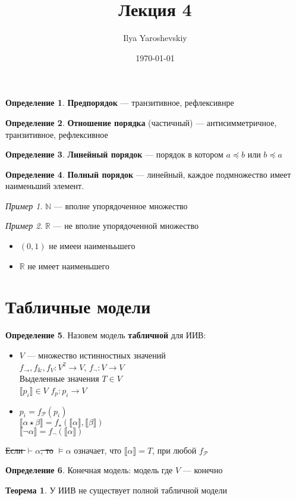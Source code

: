 \documentclass[english]{article}
\author{Ilya Yaroshevskiy}
\date{\today}
\title{Лекция 4}
\newcommand{\R}{\mathbb{R}}
\newcommand{\N}{\mathbb{N}}
\newcommand{\A}{\mathfrak{A}}
\newcommand{\B}{\mathfrak{B}}
\theoremstyle{plain}
\theoremstyle{remark}
\newtheorem*{examp}{Пример}
\theoremstyle{definition}
\newtheorem{theorem}{Теорема}[section]
\newtheorem*{definition}{Определение}
\begin{document}
\maketitle
\tableofcontents

\renewcommand{\P}{\mathcal{P}}
\newcommand{\A}{\mathcal{A}}
\newcommand{\L}{\mathcal{L}}
\newcommand{\B}{\mathcal{B}}


\begin{definition}
\textbf{Предпорядок} --- транзитивное, рефлексивнре
\end{definition}
\begin{definition}
\textbf{Отношение порядка} (частичный) --- антисимметричное, транзитивное, рефлексивное
\end{definition}
\begin{definition}
\textbf{Линейный порядок} --- порядок в котором \(a \preceq b\) или \(b \preceq a\)
\end{definition}
\begin{definition}
\textbf{Полный порядок} --- линейный, каждое подмножество имеет наименьший элемент. 
\end{definition}
\begin{examp}
\(\N\) --- вполне упорядоченное множество
\end{examp}
\begin{examp}
\(\R\) --- не вполне упорядоченной множество
\begin{itemize}
\item \((0, 1)\) не имееи наименььшего
\item \(\R\) не имеет наименьшего
\end{itemize}
\end{examp}
\section{Табличные модели}
\label{sec:org5e0f3f8}
\begin{definition}
Назовем модель \textbf{табличной} для ИИВ:
\begin{itemize}
\item \(V\) --- множество истинностных значений \\
\(f_\to,f_\&, f_V: V^2 \to V\), \(f_\neg: V \to V\) \\
Выделенные значения \(T \in V\) \\
\(\llbracket p_i \rrbracket \in V\) \(f_p : p_i \to V\)
\item \(p_i = f_\P(p_i)\) \\
\(\llbracket\alpha \star \beta\rrbracket = f_\star(\llbracket\alpha\rrbracket, \llbracket\beta\rrbracket)\) \\
\(\llbracket\neg \alpha\rrbracket = f_\neg(\llbracket\alpha\rrbracket)\)
\end{itemize}
\sout{Если \(\vdash \alpha\), то} \(\vDash \alpha\) означает, что \(\llbracket\alpha\rrbracket = T\), при любой \(f_\P\)
\label{org438e499}
\end{definition}
\begin{definition}
Конечная модель: модель где \(V\) --- конечно
\end{definition}
\begin{theorem}
У ИИВ не существует полной табличной модели
\end{theorem}
\end{document}
